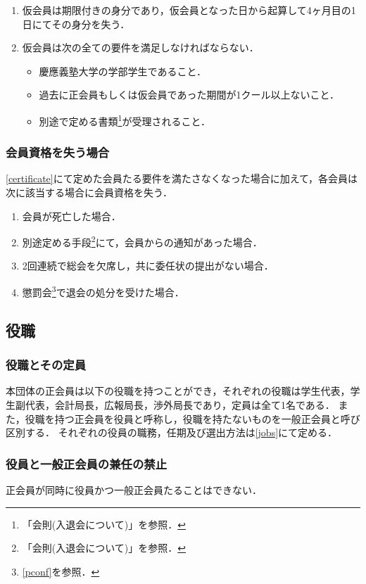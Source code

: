 \documentclass{ltjsarticle}
\begin{document}
\begin{enumerate}
\begin{itemize}
                \end{itemize}
          \item 仮会員は期限付きの身分であり，仮会員となった日から起算して4ヶ月目の1日にてその身分を失う．
          \item 仮会員は次の全ての要件を満足しなければならない．
                \begin{itemize}
                  \item 慶應義塾大学の学部学生であること．
                  \item 過去に正会員もしくは仮会員であった期間が1クール以上ないこと．
                  \item 別途で定める書類\footnote{「会則(入退会について)」を参照．}が受理されること．
                \end{itemize}
        \end{enumerate}
      \subsubsection{会員資格を失う場合}\label{condition}
        \jor
        \ref{certificate}にて定めた会員たる要件を満たさなくなった場合に加えて，各会員は次に該当する場合に会員資格を失う．
        \begin{enumerate}
          \item 会員が死亡した場合．
          \item 別途定める手段\footnote{「会則(入退会について)」を参照．}にて，会員からの通知があった場合．
          \item 2回連続で総会を欠席し，共に委任状の提出がない場合．
          \item 懲罰会\footnote{\ref{pconf}を参照．}で退会の処分を受けた場合．
        \end{enumerate}
    \subsection{役職}
      \subsubsection{役職とその定員}
        \jor
        本団体の正会員は以下の役職を持つことができ，それぞれの役職は学生代表，学生副代表，会計局長，広報局長，渉外局長であり，定員は全て1名である．
        また，役職を持つ正会員を役員と呼称し，役職を持たないものを一般正会員と呼び区別する．
        それぞれの役員の職務，任期及び選出方法は\ref{jobs}にて定める．
      \subsubsection{役員と一般正会員の兼任の禁止}
        \jor
        正会員が同時に役員かつ一般正会員たることはできない．
\end{document}

